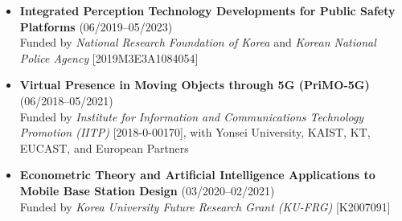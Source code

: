 \documentclass[10pt,letterpaper]{article}
\begin{document}
\begin{itemize} \itemsep=-0.8mm
    \item \textbf{Integrated Perception Technology Developments for Public Safety Platforms} (06/2019--05/2023)
    \\ Funded by \textit{National Research Foundation of Korea} and \textit{Korean National Police Agency} [2019M3E3A1084054]
    
    \item \textbf{Virtual Presence in Moving Objects through 5G (PriMO-5G)} (06/2018--05/2021)
    \\ Funded by \textit{Institute for Information and Communications Technology Promotion (IITP)} [2018-0-00170], with Yonsei University, KAIST, KT, EUCAST, and European Partners
    \item \textbf{Econometric Theory and Artificial Intelligence Applications to Mobile Base Station Design} (03/2020--02/2021)
        \\ Funded by \textit{Korea University Future Research Grant (KU-FRG)} [K2007091]
    
    \end{itemize}
\fi
\spacedhrule{0.0em}{-0.8em}
\end{document}
